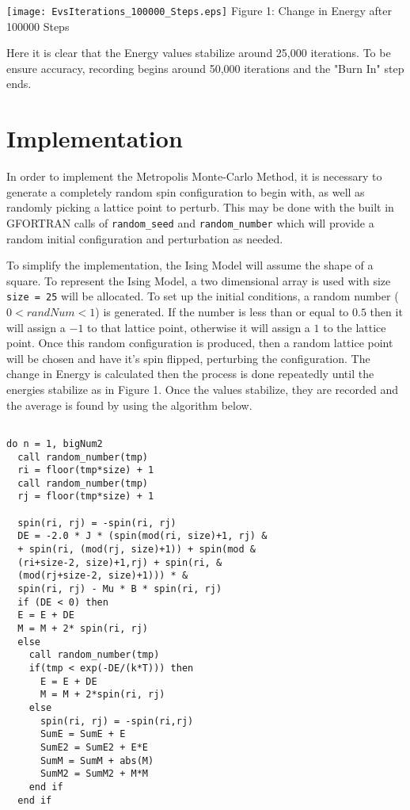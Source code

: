 \documentclass{article}
\begin{document}
\begin{multicols}{2}
\begin{center}
\texttt{[image: EvsIterations\_100000\_Steps.eps]}
\scriptsize{
Figure 1: Change in Energy after 100000 Steps
}
\end{center}

Here it is clear that the Energy values stabilize around 25,000 iterations. To be ensure accuracy, recording begins around 50,000 iterations and the "Burn In" step ends.

\section{Implementation}
In order to implement the Metropolis Monte-Carlo Method, it is necessary to generate a completely random spin configuration to begin with, as well as randomly picking a lattice point to perturb. This may be done with the built in GFORTRAN calls of \verb!random_seed! and \verb!random_number! which will provide a random initial configuration and perturbation as needed. 

To simplify the implementation, the Ising Model will assume the shape of a square. To represent the Ising Model, a two dimensional array is used with size \verb!size = 25! will be allocated. To set up the initial conditions, a random number ($0 < randNum < 1$) is generated. If the number is less than or equal to $0.5$ then it will assign a $-1$ to that lattice point, otherwise it will assign a $1$ to the lattice point. Once this random configuration is produced, then a random lattice point will be chosen and have it's spin flipped, perturbing the configuration. The change in Energy is calculated then the process is done repeatedly until the energies stabilize as in Figure 1. Once the values stabilize, they are recorded and the average is found by using the algorithm below. 

\begin{verbatim}

do n = 1, bigNum2
  call random_number(tmp)
  ri = floor(tmp*size) + 1
  call random_number(tmp)
  rj = floor(tmp*size) + 1
        
  spin(ri, rj) = -spin(ri, rj)
  DE = -2.0 * J * (spin(mod(ri, size)+1, rj) &
  + spin(ri, (mod(rj, size)+1)) + spin(mod &
  (ri+size-2, size)+1,rj) + spin(ri, &
  (mod(rj+size-2, size)+1))) * &
  spin(ri, rj) - Mu * B * spin(ri, rj)
  if (DE < 0) then
  E = E + DE
  M = M + 2* spin(ri, rj)
  else 
    call random_number(tmp)
    if(tmp < exp(-DE/(k*T))) then
      E = E + DE
      M = M + 2*spin(ri, rj)
    else
      spin(ri, rj) = -spin(ri,rj)
      SumE = SumE + E
      SumE2 = SumE2 + E*E
      SumM = SumM + abs(M)
      SumM2 = SumM2 + M*M
    end if
  end if


\end{verbatim}
\end{multicols}
\end{document}
